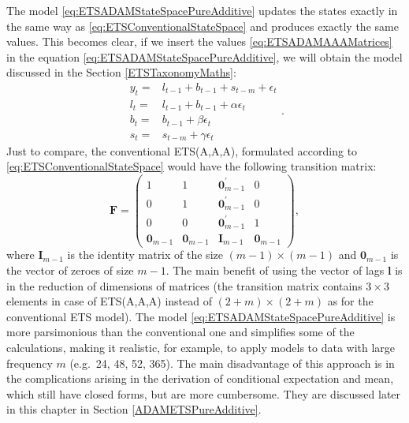 \documentclass[
]{book}
\theoremstyle{definition}
\theoremstyle{definition}
\theoremstyle{definition}
\theoremstyle{definition}
\theoremstyle{remark}
\begin{document}
The model \eqref{eq:ETSADAMStateSpacePureAdditive} updates the states exactly in the same way as \eqref{eq:ETSConventionalStateSpace} and produces exactly the same values. This becomes clear, if we insert the values \eqref{eq:ETSADAMAAAMatrices} in the equation \eqref{eq:ETSADAMStateSpacePureAdditive}, we will obtain the model discussed in the Section \ref{ETSTaxonomyMaths}:
\begin{equation}
  \begin{aligned}
    y_{t} = & l_{t-1} + b_{t-1} + s_{t-m} + \epsilon_t \\
    l_t = & l_{t-1} + b_{t-1} + \alpha \epsilon_t \\
    b_t = & b_{t-1} + \beta \epsilon_t \\
    s_t = & s_{t-m} + \gamma \epsilon_t 
  \end{aligned}.
  \label{eq:ETSADAMAAA}
\end{equation}
Just to compare, the conventional ETS(A,A,A), formulated according to \eqref{eq:ETSConventionalStateSpace} would have the following transition matrix:
\begin{equation}
  \mathbf{F} = \begin{pmatrix} 1 & 1 & \mathbf{0}^\prime_{m-1} & 0 \\ 0 & 1 & \mathbf{0}^\prime_{m-1} & 0 \\ 0 & 0 & \mathbf{0}^\prime_{m-1} & 1 \\ \mathbf{0}_{m-1} & \mathbf{0}_{m-1} & \mathbf{I}_{m-1} & \mathbf{0}_{m-1} \end{pmatrix},
  \label{eq:ETSADAMAAAMatricesTransition}
\end{equation}
where \(\mathbf{I}_{m-1}\) is the identity matrix of the size \((m-1) \times (m-1)\) and \(\mathbf{0}_{m-1}\) is the vector of zeroes of size \(m-1\). The main benefit of using the vector of lags \(\boldsymbol{l}\) is in the reduction of dimensions of matrices (the transition matrix contains \(3\times 3\) elements in case of ETS(A,A,A) instead of \((2+m)\times (2+m)\) as for the conventional ETS model). The model \eqref{eq:ETSADAMStateSpacePureAdditive} is more parsimonious than the conventional one and simplifies some of the calculations, making it realistic, for example, to apply models to data with large frequency \(m\) (e.g.~24, 48, 52, 365). The main disadvantage of this approach is in the complications arising in the derivation of conditional expectation and mean, which still have closed forms, but are more cumbersome. They are discussed later in this chapter in Section \ref{ADAMETSPureAdditive}.
\end{document}
